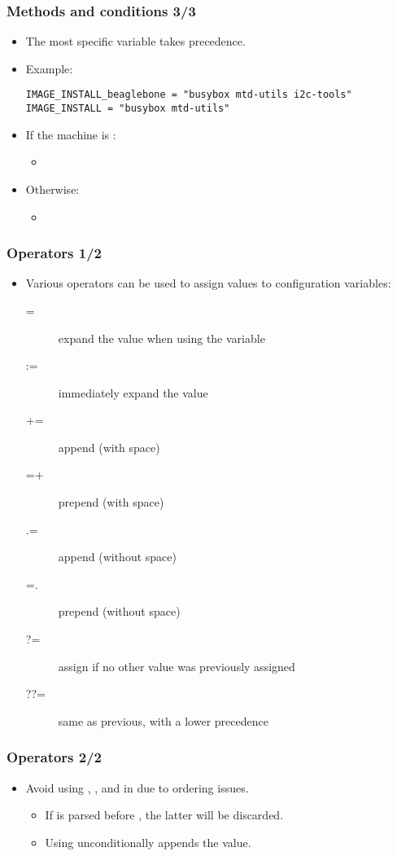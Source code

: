 \begin{frame}[fragile]
  \frametitle{Methods and conditions 3/3}
  \begin{itemize}
    \item The most specific variable takes precedence.
    \item Example:
      \begin{verbatim}
IMAGE_INSTALL_beaglebone = "busybox mtd-utils i2c-tools"
IMAGE_INSTALL = "busybox mtd-utils"
      \end{verbatim}
    \item If the machine is :
      \begin{itemize}
        \item {}
      \end{itemize}
    \item Otherwise:
      \begin{itemize}
        \item {}
      \end{itemize}
  \end{itemize}
\end{frame}

\begin{frame}
  \frametitle{Operators 1/2}
  \begin{itemize}
    \item Various operators can be used to assign values to
    configuration variables:
      \begin{description}
        \item[=] expand the value when using the variable
        \item[:=] immediately expand the value
        \item[+=] append (with space)
        \item[=+] prepend (with space)
        \item[.=] append (without space)
        \item[=.] prepend (without space)
        \item[?=] assign if no other value was previously assigned
        \item[??=] same as previous, with a lower precedence
      \end{description}
  \end{itemize}
\end{frame}

\begin{frame}
  \frametitle{Operators 2/2}
  \begin{itemize}
    \item Avoid using \code{+=}, \code{=+},  and 
      in  due to ordering issues.
      \begin{itemize}
        \item If \code{+=} is parsed before , the latter will
          be discarded.
        \item Using  unconditionally appends the value.
      \end{itemize}
  \end{itemize}
\end{frame}

